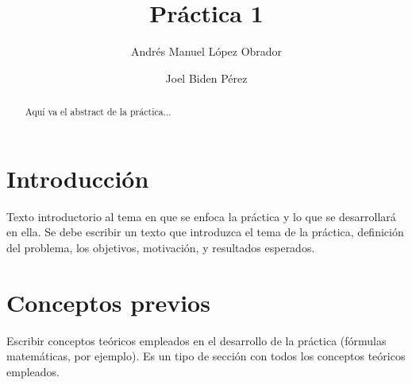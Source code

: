 \documentclass[sigconf]{acmart}
\begin{document}
\title{Pr{\'a}ctica 1}

\author{Andr{\'e}s Manuel L{\'o}pez Obrador}

\author{Joel Biden P{\'e}rez}






\begin{abstract}
  Aqu{\'i} va el abstract de la pr{\'a}ctica...
\end{abstract}




\maketitle

\section{Introducci{\'o}n}
Texto introductorio al tema en que se enfoca la pr{\'a}ctica y lo que se desarrollar{\'a} en ella. Se debe escribir un texto que introduzca el tema de la 
pr{\'a}ctica, definici{\'o}n del problema, los objetivos, motivaci{\'o}n,  y resultados esperados.
\section{Conceptos previos}
Escribir conceptos te{\'o}ricos empleados en el desarrollo de la pr{\'a}ctica (f{\'o}rmulas matem{\'a}ticas, por ejemplo). Es un tipo de secci{\'o}n con todos los conceptos te{\'o}ricos empleados.
\end{document}
